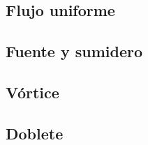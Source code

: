 \subsection*{Flujo uniforme}

\subsection*{Fuente y sumidero}

\subsection*{Vórtice}

\subsection*{Doblete}
